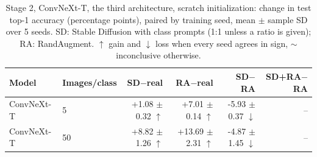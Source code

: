 \begin{table}[H]
\centering
\small
\setlength{\tabcolsep}{4pt}
\caption{Stage 2, ConvNeXt-T, the third architecture, scratch initialization: change in test top-1 accuracy (percentage points), paired by training seed, mean $\pm$ sample SD over 5 seeds. SD: Stable Diffusion with class prompts (1:1 unless a ratio is given); RA: RandAugment. $\uparrow$ gain and $\downarrow$ loss when every seed agrees in sign, $\sim$ inconclusive otherwise.}
\label{tab:stage2-convnext-scratch-test}
\begin{tabular}{llrrrr}
\toprule
Model & Images/class & SD$-$real & RA$-$real & SD$-$RA & SD+RA$-$RA \\
\midrule
ConvNeXt-T & 5 & +1.08 $\pm$ 0.32 $\uparrow$ & +7.01 $\pm$ 0.14 $\uparrow$ & -5.93 $\pm$ 0.37 $\downarrow$ & -- \\
ConvNeXt-T & 50 & +8.82 $\pm$ 1.26 $\uparrow$ & +13.69 $\pm$ 2.31 $\uparrow$ & -4.87 $\pm$ 1.45 $\downarrow$ & -- \\
\bottomrule
\end{tabular}
\end{table}

